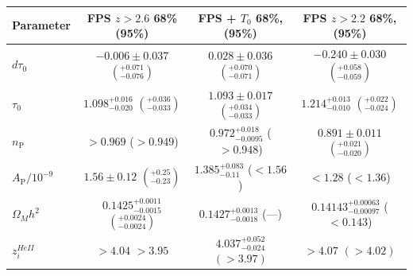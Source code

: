 
\begin{table}
	\centering
      \def\arraystretch{1.2}
\begin{tabular} {| l | c | c | c|}
\hline
Parameter &  FPS $z>2.6$ 68\% (95\%) &  FPS + $T_0$ 68\%, (95\%) & FPS $z>2.2$ 68\%, (95\%) \\
\hline
$d\tau_0        $ & $-0.006\pm 0.037$  $\left(^{+0.071}_{-0.076}\right)$                   & $0.028\pm 0.036$            $\left(^{+0.070}_{-0.071}\right)$                   & $-0.240\pm 0.030$     $\left(^{+0.058}_{-0.059}  \right)$   \\
$\tau_0         $ & $1.098^{+0.016}_{-0.020}$  $\left( ^{+0.036}_{-0.033}\right)$            & $1.093\pm 0.017$       $\left(^{+0.034}_{-0.033}\right)$                   & $1.214^{+0.013}_{-0.010}$   $\left(^{+0.022}_{-0.024}\right)$   \\
$n_\mathrm{P}   $ & $> 0.969                   $  ($> 0.949                   $)  & $0.972^{+0.018}_{-0.0095}$  ($> 0.948   $)    & $0.891\pm 0.011$            $\left(^{+0.021}_{-0.020}\right)$   \\
$A_\mathrm{P}/10^{-9}$ & $1.56\pm 0.12$        $\left(^{+0.25}_{-0.23}\right)$        & $1.385^{+0.083}_{-0.11}$   ($< 1.56 $)                   &           $< 1.28 $  ($< 1.36$)   \\
$\Omega_M h^2   $ & $0.1425^{+0.0011}_{-0.0015}$ $(^{+0.0024}_{-0.0024})$       & $0.1427^{+0.0013}_{-0.0018}$  (---)                              & $0.14143^{+0.00063}_{-0.00097}$ ($< 0.143$)   \\
$z^{HeII}_i     $ & $> 4.04                    $ $> 3.95                    $  & $4.037^{+0.052}_{-0.024}   $ $(> 3.97 ) $    & $> 4.07                    $  $(> 4.02)$   \\

\end{tabular}
\end{table}
